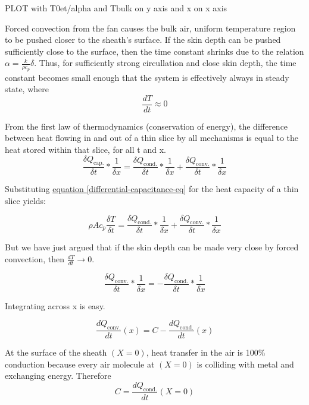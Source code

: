 \documentclass[10pt, twocolumn]{article}
\begin{document}
PLOT with T0et/alpha and Tbulk on y axis and x on x axis

Forced convection from the fan causes the bulk air, uniform temperature
region to be pushed closer to the sheath's surface.
If the skin depth can be pushed sufficiently close to the surface,
then the time constant shrinks due to the relation $\alpha=\frac{k}{\rho c_{p}}\delta$.
Thus, for sufficiently strong circullation and close skin depth, the time
constant becomes small enough that the system is effectively always in
steady state, where
\begin{equation*}
\frac{dT}{dt}\approx 0
\end{equation*}

From the first law of thermodynamics (conservation of energy),
the difference between heat flowing in and out of a thin slice by
all mechanisms is equal to the heat stored within that slice, for all t and x.
\begin{equation*}
\frac{\delta Q_{\textrm{cap.}}}{\delta t}*\frac{1}{\delta x}=
\frac{\delta Q_{\textrm{cond.}}}{\delta t}*\frac{1}{\delta x}+
\frac{\delta Q_{\textrm{conv.}}}{\delta t}*\frac{1}{\delta x}
\end{equation*}

Substituting
\hyperref[differential-capacitance-eq]{equation \ref{differential-capacitance-eq}}
for the heat capacity of a thin slice yields:

\begin{equation*}
\rho A c_{p}\frac{\delta T}{\delta t}=
\frac{\delta Q_{\textrm{cond.}}}{\delta t}*\frac{1}{\delta x}+
\frac{\delta Q_{\textrm{conv.}}}{\delta t}*\frac{1}{\delta x}
\end{equation*}

But we have just argued that if the skin depth can be made very close
by forced convection, then $\frac{dT}{dt}\rightarrow 0$.

\begin{equation*}
\frac{\delta Q_{\textrm{conv.}}}{\delta t}*\frac{1}{\delta x}=-
\frac{\delta Q_{\textrm{cond.}}}{\delta t}*\frac{1}{\delta x}
\end{equation*}

Integrating across x is easy.

\begin{equation*}
\frac{dQ_{\textrm{conv.}}}{dt}(x)=C-
\frac{dQ_{\textrm{cond.}}}{dt}(x)
\end{equation*}

At the surface of the sheath \((X=0)\), heat transfer in the air is
100\% conduction because every air molecule at \((X=0)\) is colliding
with metal and exchanging energy. Therefore
\begin{equation*}
C=\frac{dQ_{\textrm{cond.}}}{dt}(X=0)
\end{equation*}
\end{document}
